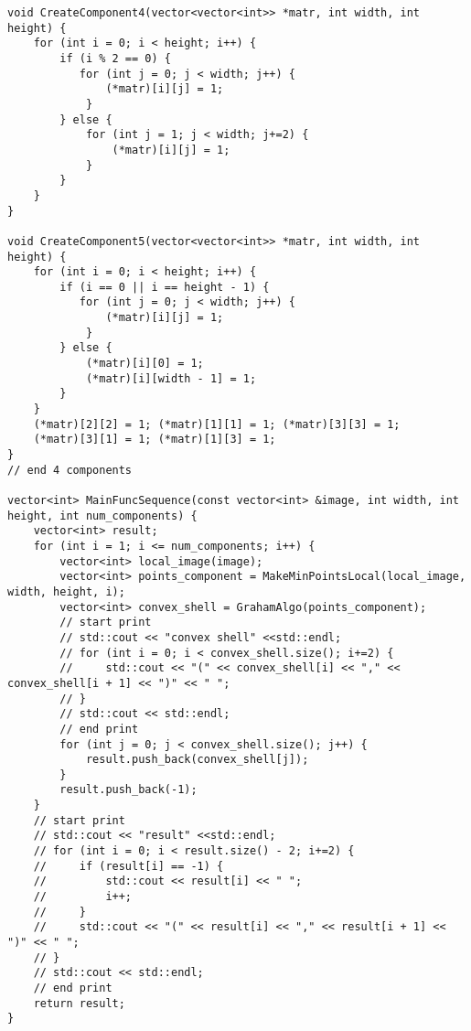 \documentclass{report}
\begin{document}
\begin{lstlisting}
void CreateComponent4(vector<vector<int>> *matr, int width, int height) {
    for (int i = 0; i < height; i++) {
        if (i % 2 == 0) {
           for (int j = 0; j < width; j++) {
               (*matr)[i][j] = 1;
            }
        } else {
            for (int j = 1; j < width; j+=2) {
                (*matr)[i][j] = 1;
            }
        }
    }
}

void CreateComponent5(vector<vector<int>> *matr, int width, int height) {
    for (int i = 0; i < height; i++) {
        if (i == 0 || i == height - 1) {
           for (int j = 0; j < width; j++) {
               (*matr)[i][j] = 1;
            }
        } else {
            (*matr)[i][0] = 1;
            (*matr)[i][width - 1] = 1;
        }
    }
    (*matr)[2][2] = 1; (*matr)[1][1] = 1; (*matr)[3][3] = 1;
    (*matr)[3][1] = 1; (*matr)[1][3] = 1;
}
// end 4 components

vector<int> MainFuncSequence(const vector<int> &image, int width, int height, int num_components) {
    vector<int> result;
    for (int i = 1; i <= num_components; i++) {
        vector<int> local_image(image);
        vector<int> points_component = MakeMinPointsLocal(local_image, width, height, i);
        vector<int> convex_shell = GrahamAlgo(points_component);
        // start print
        // std::cout << "convex shell" <<std::endl;
        // for (int i = 0; i < convex_shell.size(); i+=2) {
        //     std::cout << "(" << convex_shell[i] << "," << convex_shell[i + 1] << ")" << " ";
        // }
        // std::cout << std::endl;
        // end print
        for (int j = 0; j < convex_shell.size(); j++) {
            result.push_back(convex_shell[j]);
        }
        result.push_back(-1);
    }
    // start print
    // std::cout << "result" <<std::endl;
    // for (int i = 0; i < result.size() - 2; i+=2) {
    //     if (result[i] == -1) {
    //         std::cout << result[i] << " ";
    //         i++;
    //     }
    //     std::cout << "(" << result[i] << "," << result[i + 1] << ")" << " ";
    // }
    // std::cout << std::endl;
    // end print
    return result;
}



\end{lstlisting}
\end{document}
